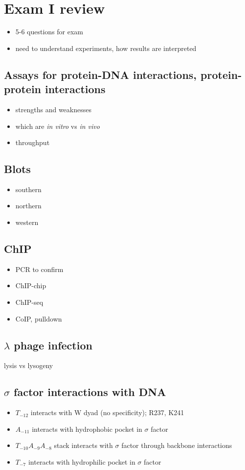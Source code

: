 \documentclass[10pt]{article}
\newenvironment{mitemize}
{
  \begin{itemize}
  \setlength{\itemsep}{1pt}
  \setlength{\parskip}{0pt}
  \setlength{\parsep}{0pt}}{\end{itemize}
}
\begin{document}
\section*{Exam I review}

\begin{mitemize}
  \item 5-6 questions for exam
  \item need to understand experiments, how results are interpreted
\end{mitemize}

\subsection*{Assays for protein-DNA interactions, protein-protein interactions}
\begin{mitemize}
  \item strengths and weaknesses
  \item which are \textit{in vitro} vs \textit{in vivo}
  \item throughput
\end{mitemize}

\subsection*{Blots}
\begin{mitemize}
  \item southern
  \item northern
  \item western
\end{mitemize}

\subsection*{ChIP}
\begin{mitemize}
  \item PCR to confirm
  \item ChIP-chip
  \item ChIP-seq
  \item CoIP, pulldown
\end{mitemize}

\subsection*{$\lambda$ phage infection}
lysis vs lysogeny

\subsection*{$\sigma$ factor interactions with DNA}
\begin{mitemize}
  \item $T_{-12}$ interacts with W dyad (no specificity); R237, K241
  \item $A_{-11}$ interacts with hydrophobic pocket in $\sigma$ factor
  \item $T_{-10}A_{-9}A_{-8}$ stack interacts with $\sigma$ factor through backbone interactions
  \item $T_{-7}$ interacts with hydrophilic pocket in $\sigma$ factor
\end{mitemize}
\end{document}
